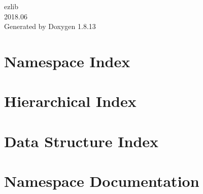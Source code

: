 \documentclass[twoside]{book}
\newcommand{\+}{\discretionary{\mbox{\scriptsize$\hookleftarrow$}}{}{}}
\newcommand{\clearemptydoublepage}{%
  \newpage{\pagestyle{empty}\cleardoublepage}%
}
\begin{document}
\hypersetup{pageanchor=false,
             bookmarksnumbered=true,
             pdfencoding=unicode
            }
\begin{titlepage}
\vspace*{7cm}
\begin{center}%
{\Large ezlib \\[1ex]\large 2018.\+06 }\\
\vspace*{1cm}
{\large Generated by Doxygen 1.8.13}\\
\end{center}
\end{titlepage}
\clearemptydoublepage
{}
\tableofcontents
\clearemptydoublepage
{}
\hypersetup{pageanchor=true}

\chapter{Namespace Index}

\chapter{Hierarchical Index}

\chapter{Data Structure Index}

\chapter{Namespace Documentation}

\end{document}
